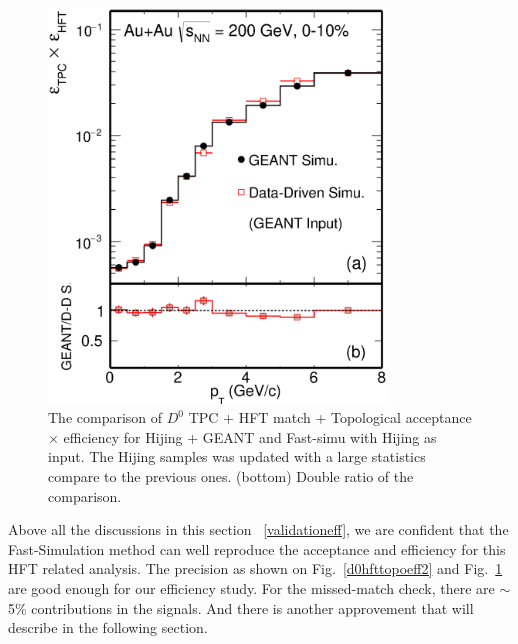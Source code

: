 \begin{figure}[htbp]
\centering
\includegraphics[keepaspectratio,width=0.8\textwidth,angle=0]{figure/Run14_D0HFT/Mcd0Eff_0_10.eps}
\caption{The comparison of $D^0$ TPC + HFT match + Topological acceptance $\times$ efficiency for Hijing + GEANT and Fast-simu with Hijing as input. The Hijing samples was updated with a large statistics compare to the previous ones. (bottom) Double ratio of the comparison.}
\label{d0hfttopoeff_hijing_0_10}
\end{figure}


Above all the discussions in this section ~\ref{validationeff}, we are confident that the Fast-Simulation method can well reproduce the acceptance and efficiency for this HFT related analysis. The precision as shown on Fig.~\ref{d0hfttopoeff2} and Fig.~\ref{d0hfttopoeff_hijing_0_10} are good enough for our efficiency study. For the missed-match check, there are $\sim$5\% contributions in the signals. And there is another approvement that will describe in the following section.

